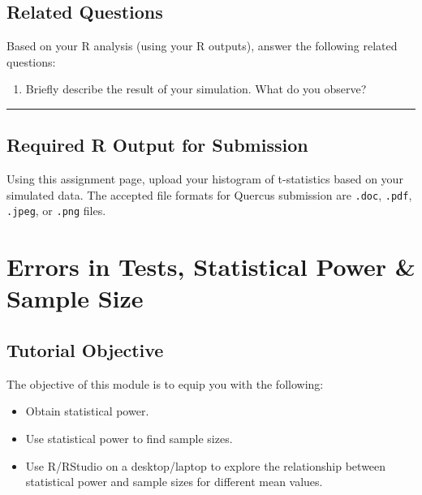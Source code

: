 \documentclass[oneside,openany]{book}
\providecommand{\tightlist}{%
  \setlength{\itemsep}{0pt}\setlength{\parskip}{0pt}}
\begin{document}
\section{Related Questions}\label{related-questions-5}

Based on your R analysis (using your R outputs), answer the following related questions:

\begin{enumerate}
\def\labelenumi{\arabic{enumi}.}
\tightlist
\item
  Briefly describe the result of your simulation. What do you observe?
\end{enumerate}

\begin{center}\rule{0.5\linewidth}{0.5pt}\end{center}

\section{Required R Output for Submission}\label{required-r-output-for-submission-2}

Using this assignment page, upload your histogram of t-statistics based on your simulated data. The accepted file formats for Quercus submission are \texttt{.doc}, \texttt{.pdf}, \texttt{.jpeg}, or \texttt{.png} files.

\chapter{Errors in Tests, Statistical Power \& Sample Size}\label{activity-7---errors-in-tests-statistical-power-sample-size}

\section{Tutorial Objective}\label{tutorial-objective-4}

The objective of this module is to equip you with the following:

\begin{itemize}
    \item Obtain statistical power.
    \item Use statistical power to find sample sizes.
    \item Use R/RStudio on a desktop/laptop to explore the relationship between statistical power and sample sizes for different mean values.
\end{itemize}
\end{document}
